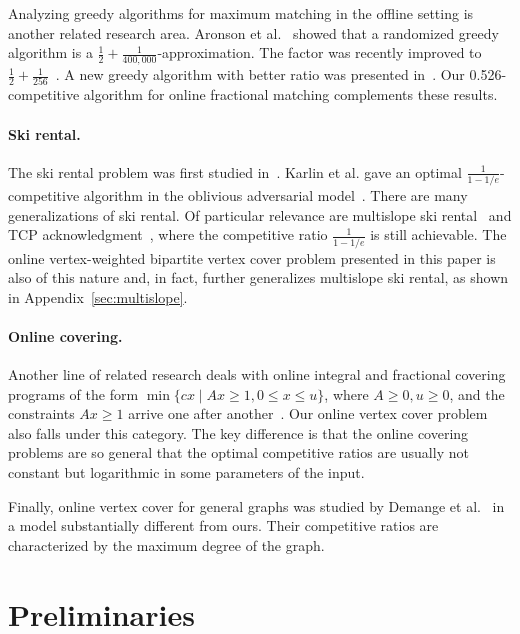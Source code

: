 \documentclass{article}
\begin{document}
Analyzing greedy algorithms for maximum matching in the offline setting is another related research area. Aronson et al.~\cite{Aronson1995} showed that a randomized greedy algorithm is a $\frac{1}{2}+\frac{1}{400,000}$-approximation. The factor was recently improved to $\frac{1}{2}+\frac{1}{256}$~\cite{poloczek12}. A new greedy algorithm with better ratio was presented in~\cite{goel12}. Our 0.526-competitive algorithm for online fractional matching complements these results. 

\paragraph{Ski rental.} The ski rental problem was first studied in~\cite{karlin1988competitive}. Karlin et al. gave an optimal $\frac{1}{1-1/e}$-competitive algorithm in the oblivious adversarial model~\cite{Karlin1994}. There are many generalizations of ski rental. Of particular relevance are multislope ski rental~\cite{Lotker2008}  and TCP acknowledgment~\cite{Karlin2001}, where the competitive ratio $\frac{1}{1-1/e}$ is still achievable. 
The online vertex-weighted bipartite vertex cover problem presented in this paper is also of this nature and, in fact, further generalizes multislope ski rental, as shown in Appendix~\ref{sec:multislope}.

\paragraph{Online covering.} Another line of related research deals with online integral and fractional covering programs of the form $\min\{ cx\mid Ax\geq 1,0\leq x\leq u\}$, where $A\geq 0,u\geq 0$, and the constraints $Ax\geq 1$ arrive one after another~\cite{Buchbinder2009}. Our online vertex cover problem also falls under this category. The key difference is that the online covering problems are so general that the optimal competitive ratios are usually not constant but logarithmic in some parameters of the input.

Finally, online vertex cover for general graphs was studied by Demange et al.~\cite{Demange2005} in a model substantially different from ours. Their competitive ratios are characterized by the maximum degree of the graph.


\section{Preliminaries}
\end{document}
